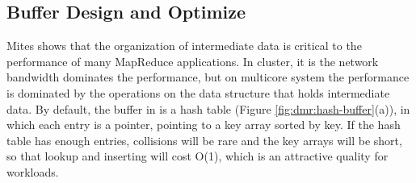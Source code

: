 %



\subsection{Buffer Design and Optimize}
Mites \cite{mao2010metis} shows that the organization of intermediate data is critical to the performance of many MapReduce applications.
In cluster, it is the network bandwidth dominates the performance, but on multicore system the performance is dominated by the operations on the data structure that holds intermediate data.
By default, the buffer in \myds is a hash table (Figure \ref{fig:dmr:hash-buffer}(a)), in which each entry is a pointer, pointing to a key array sorted by key.
If the hash table has enough entries, collisions will be rare and the key arrays will be short, so that lookup and inserting will cost O(1), which is an attractive quality for workloads.


